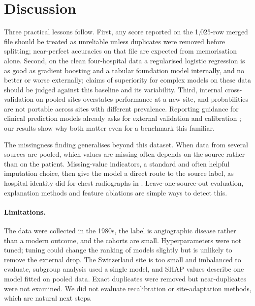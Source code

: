 \documentclass[11pt]{article}
\begin{document}
\begin{table}[t]
\centering
\caption{Subgroup AUROC of logistic regression (out-of-fold, internal cross-validation).}
\label{tab:sub}

\end{table}

\section{Discussion}
Three practical lessons follow. First, any score reported on the 1,025-row merged file should be treated as unreliable unless duplicates were removed before splitting; near-perfect accuracies on that file are expected from memorisation alone. Second, on the clean four-hospital data a regularised logistic regression is as good as gradient boosting and a tabular foundation model internally, and no better or worse externally; claims of superiority for complex models on these data should be judged against this baseline and its variability. Third, internal cross-validation on pooled sites overstates performance at a new site, and probabilities are not portable across sites with different prevalence. Reporting guidance for clinical prediction models already asks for external validation and calibration \citep{collins2024tripodai}; our results show why both matter even for a benchmark this familiar.

The missingness finding generalises beyond this dataset. When data from several sources are pooled, which values are missing often depends on the source rather than on the patient. Missing-value indicators, a standard and often helpful imputation choice, then give the model a direct route to the source label, as hospital identity did for chest radiographs in \citet{zech2018variable}. Leave-one-source-out evaluation, explanation methods and feature ablations are simple ways to detect this.

\paragraph{Limitations.} The data were collected in the 1980s, the label is angiographic disease rather than a modern outcome, and the cohorts are small. Hyperparameters were not tuned; tuning could change the ranking of models slightly but is unlikely to remove the external drop. The Switzerland site is too small and imbalanced to evaluate, subgroup analysis used a single model, and SHAP values describe one model fitted on pooled data. Exact duplicates were removed but near-duplicates were not examined. We did not evaluate recalibration or site-adaptation methods, which are natural next steps.
\end{document}

